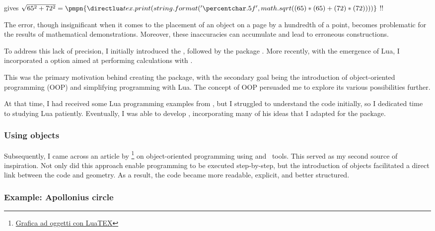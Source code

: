 gives 
\tkzHand $\sqrt{65^2+72^2} = \pmpn{\luaveclen{65}{72}} $ {\color{red}!!}

The error, though insignificant when it comes to the placement of an object on a page by a hundredth of a point, becomes problematic for the results of mathematical demonstrations. Moreover, these inaccuracies can accumulate and lead to erroneous constructions.

\vspace{.5em}
To address this lack of precision, I initially introduced the , followed by the package . More recently, with the emergence of Lua\LATEX{}, I incorporated a  option aimed at performing calculations with .

This was the primary motivation behind creating the package, with the secondary goal being the introduction of object-oriented programming (OOP) and simplifying programming with Lua. The concept of OOP persuaded me to explore its various possibilities further.

At that time, I had received some Lua programming examples from {}, but I struggled to understand the code initially, so I dedicated time to studying Lua patiently. Eventually, I was able to develop \tkzname{\tkznameofpack}, incorporating many of his ideas that I adapted for the package.


\subsubsection{Using objects} %
\label{ssub:using_objects}

Subsequently, I came across an article by \footnote{\href{https://www.guitex.org/home/images/meeting2012/slides/presentazione_giacomell_guitmeeting_2012.pdf}{Grafica ad oggetti con LuaTEX}}  on object-oriented programming using  and \TIKZ\ tools. This served as my second source of inspiration.   Not only did this approach enable programming to be executed step-by-step, but the introduction of objects facilitated a direct link between the code and geometry. As a result, the code became more readable, explicit, and better structured.
 
\subsubsection{Example: Apollonius circle} %
\label{ssub:example_apollonius_circle}

